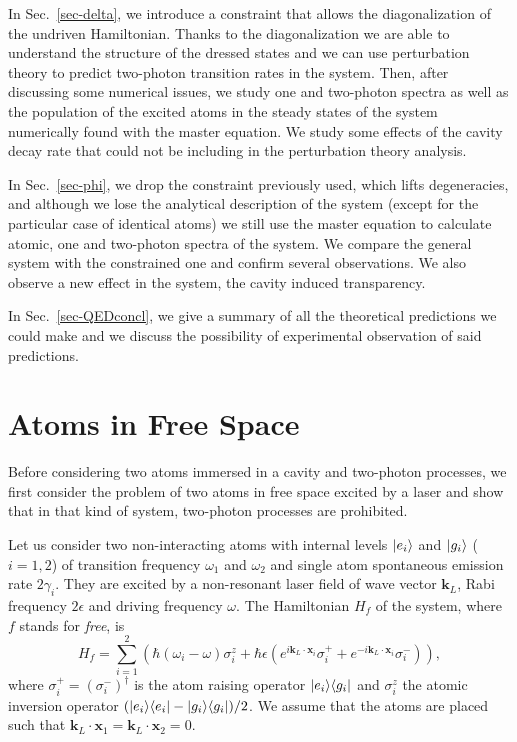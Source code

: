In Sec.~\ref{sec-delta}, we introduce a constraint that allows the diagonalization of the undriven Hamiltonian. Thanks to the diagonalization we are able to understand the structure of the dressed states and we can use perturbation theory to predict two-photon transition rates in the system. Then, after discussing some numerical issues, we study one and two-photon spectra as well as the population of the excited atoms in the steady states of the system numerically found with the master equation. We study some effects of the cavity decay rate that could not be including in the perturbation theory analysis. 

In Sec.~\ref{sec-phi}, we drop the constraint previously used, which lifts degeneracies, and although we lose the analytical description of the system (except for the particular case of identical atoms) we still use the master equation to calculate  atomic, one and two-photon spectra of the system. We compare the general system with the constrained one and confirm several observations. We also observe a new effect in the system, the cavity induced transparency. 

In Sec.~\ref{sec-QEDconcl}, we give a summary of all the theoretical predictions we could make and we discuss the possibility of experimental observation of said predictions.

\section{Atoms in Free Space} \label{sec-free}

Before considering two atoms immersed in a cavity and two-photon processes, we first consider the problem of two atoms in free space excited by a laser and show that in that kind of system, two-photon processes are prohibited.

Let us consider two non-interacting atoms with internal levels $| e_i \rangle$ and $| g_i \rangle$ ($i=1,2$) of transition frequency $\omega_1$ and $\omega_2$ and single atom spontaneous emission rate $2 \gamma_i$. They are excited by a non-resonant laser field of wave vector $\mathbf k_L$, Rabi frequency $2\epsilon$ and driving frequency $\omega$. The Hamiltonian $H_f$  of the system, where $f$ stands for \emph{free}, is
\[ H_f = \sum_{i=1}^2 \left( \hbar (\omega_i-\omega) \sigma^{z}_i +   \hbar \epsilon \left(e^{i \mathbf k_L \cdot \mathbf x_i} \sigma^+_i +e^{-i \mathbf k_L \cdot \mathbf x_i} \sigma^-_i    \right) \right), \]
where $\sigma_i^+ = (\sigma_i^-)^{\dagger}$ is the atom raising operator $| e_i \rangle \langle g_i |$ and $\sigma_i^z$ the atomic inversion operator $(| e_i \rangle \langle e_i |-| g_i \rangle \langle g_i |)/2$. We assume that the atoms are placed such that $\mathbf k_L \cdot \mathbf x_1 = \mathbf k_L \cdot \mathbf x_2 = 0$.

